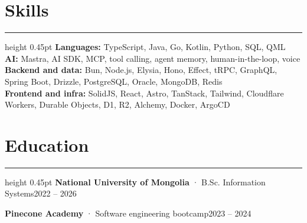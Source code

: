 \documentclass[9.5pt,letterpaper]{article}
\newcommand{\cvsection}[1]{\section*{#1}\vspace{3pt}\hrule height 0.45pt\vspace{3pt}}
\newcommand{\dated}[2]{#1\hfill#2\par}
\begin{document}
\cvsection{Skills}
\textbf{Languages:} TypeScript, Java, Go, Kotlin, Python, SQL, QML\\
\textbf{AI:} Mastra, AI SDK, MCP, tool calling, agent memory, human-in-the-loop, voice\\
\textbf{Backend and data:} Bun, Node.js, Elysia, Hono, Effect, tRPC, GraphQL, Spring Boot, Drizzle, PostgreSQL, Oracle, MongoDB, Redis\\
\textbf{Frontend and infra:} SolidJS, React, Astro, TanStack, Tailwind, Cloudflare Workers, Durable Objects, D1, R2, Alchemy, Docker, ArgoCD

\cvsection{Education}
\dated{\textbf{National University of Mongolia} · B.Sc. Information Systems}{2022 – 2026}
\dated{\textbf{Pinecone Academy} · Software engineering bootcamp}{2023 – 2024}
\end{document}
